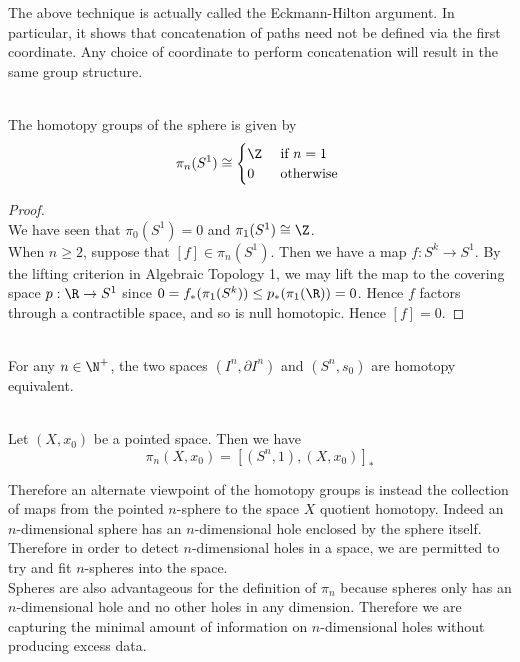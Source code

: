 \documentclass[a4paper]{article}
\begin{document}
The above technique is actually called the Eckmann-Hilton argument. In particular, it shows that concatenation of paths need not be defined via the first coordinate. Any choice of coordinate to perform concatenation will result in the same group structure. \\

\begin{eg}{}{}\\
The homotopy groups of the sphere is given by $$\pi_n(S^1)\cong\begin{cases}
\Z & \text{ if } n=1\\
0 & \text{ otherwise }
\end{cases}$$
\begin{proof}\\
We have seen that $\pi_0(S^1)=0$ and $\pi_1(S^1)\cong\Z$. \\

When $n\geq 2$, suppose that $[f]\in\pi_n(S^1)$. Then we have a map $f:S^k\to S^1$. By the lifting criterion in Algebraic Topology 1, we may lift the map to the covering space $p:\R\to S^1$ since $0=f_\ast(\pi_1(S^k))\leq p_\ast(\pi_1(\R))=0$. Hence $f$ factors through a contractible space, and so is null homotopic. Hence $[f]=0$. 
\end{proof}
\end{eg}

\begin{lmm}{}{}\\
For any $n\in\N^+$, the two spaces $(I^n,\partial I^n)$ and $(S^n,s_0)$ are homotopy equivalent. 
\end{lmm}

\begin{crl}{}{}\\
Let $(X,x_0)$ be a pointed space. Then we have $$\pi_n(X,x_0)=[(S^n,1),(X,x_0)]_\ast$$
\end{crl}

Therefore an alternate viewpoint of the homotopy groups is instead the collection of maps from the pointed $n$-sphere to the space $X$ quotient homotopy. Indeed an $n$-dimensional sphere has an $n$-dimensional hole enclosed by the sphere itself. Therefore in order to detect $n$-dimensional holes in a space, we are permitted to try and fit $n$-spheres into the space. \\

Spheres are also advantageous for the definition of $\pi_n$ because spheres only has an $n$-dimensional hole and no other holes in any dimension. Therefore we are capturing the minimal amount of information on $n$-dimensional holes without producing excess data. \\
\end{document}
